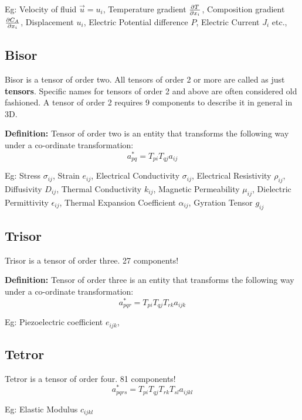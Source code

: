 Eg: Velocity of fluid $\vec{u} = u_i$, Temperature gradient $\partial T \over \partial x_i$, Composition gradient $\partial C_A \over \partial x_i$, Displacement $u_i$, Electric Potential difference $P$, Electric Current $J_i$ etc.,

\subsection{Bisor}
Bisor is a tensor of order two. All tensors of order 2 or more are called as just {\bf tensors}. Specific names for tensors of order 2 and above are often considered old fashioned. A tensor of order 2 requires 9 components to describe it in general in 3D. 

{\bf Definition:} Tensor of order two is an entity that transforms the following way under a co-ordinate transformation: 
\begin{equation}
a^*_{pq} = T_{pi}T_{qj}a_{ij}
\end{equation} 

Eg: Stress $\sigma_{ij}$, Strain $e_{ij}$, Electrical Conductivity $\sigma_{ij}$, Electrical Resistivity $\rho_{ij}$, Diffusivity $D_{ij}$, Thermal Conductivity $k_{ij}$, Magnetic Permeability $\mu_{ij}$, Dielectric Permittivity $\epsilon_{ij}$, Thermal Expansion Coefficient $\alpha_{ij}$, Gyration Tensor $g_{ij}$

\subsection{Trisor}

Trisor is a tensor of order three. 27 components! 

{\bf Definition:} Tensor of order three is an entity that transforms the following way under a co-ordinate transformation: 
\begin{equation}
a^*_{pqr} = T_{pi}T_{qj}T_{rk}a_{ijk}
\end{equation} 

Eg: Piezoelectric coefficient $e_{ijk}$, 

\subsection{Tetror}

Tetror is a tensor of order four. 81 components! 
\begin{equation}
a^*_{pqrs} = T_{pi}T_{qj}T_{rk}T_{sl} a_{ijkl}
\end{equation}

Eg: Elastic Modulus $c_{ijkl}$


